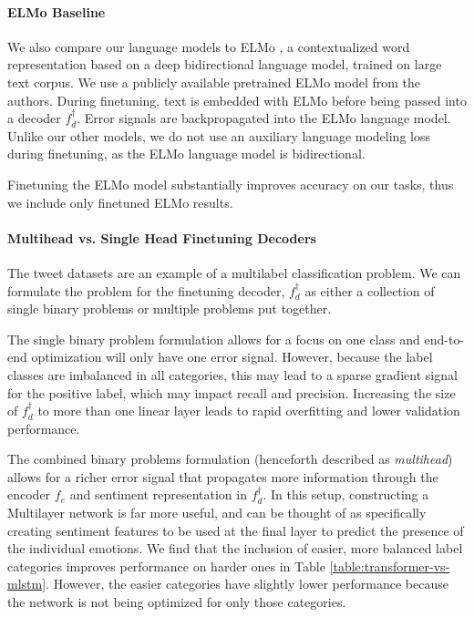 \documentclass[letterpaper]{article} %
\begin{document}
\paragraph{ELMo Baseline}
We also compare our language models to ELMo \protect\cite{ELMo}, a contextualized word representation based on a deep bidirectional language model, trained on large text corpus. We use a publicly available pretrained ELMo model from the authors. During finetuning, text is embedded with ELMo before being passed into a decoder $f_d^{\dagger}$. Error signals are backpropagated into the ELMo language model. Unlike our other models, we do not use an auxiliary language modeling loss during finetuning, as the ELMo language model is bidirectional.

Finetuning the ELMo model substantially improves accuracy on our tasks, thus we include only finetuned ELMo results.

\paragraph{Multihead vs. Single Head Finetuning Decoders}
The tweet datasets are an example of a multilabel classification problem. We can formulate the problem for the finetuning decoder, $f_d^{\dagger}$ as either a collection of single binary problems or multiple problems put together.

The single binary problem formulation allows for a focus on one class and end-to-end optimization will only have one error signal. However, because the label classes are imbalanced in all categories, this may lead to a sparse gradient signal for the positive label, which may impact recall and precision. Increasing the size of $f_d^{\dagger}$ to more than one linear layer leads to rapid overfitting and lower validation performance.

The combined binary problems formulation (henceforth described as \textit{multihead}) allows for a richer error signal that propagates more information through the encoder $f_e$ and sentiment representation in $f^{\dagger}_d$. In this setup, constructing a Multilayer network is far more useful, and can be thought of as specifically creating sentiment features to be used at the final layer to predict the presence of the individual emotions. We find that the inclusion of easier, more balanced label categories improves performance on harder ones in Table \ref{table:transformer-vs-mlstm}. However, the easier categories have slightly lower performance because the network is not being optimized for only those categories.
\end{document}
